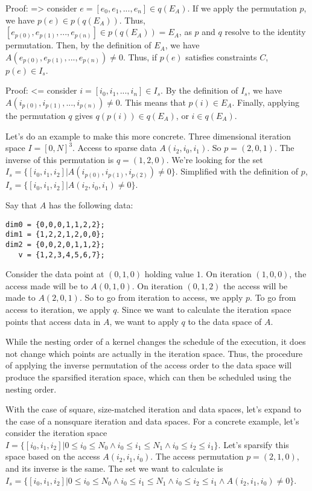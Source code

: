 Proof: => 
consider $e = [e_0,e_1,...,e_n] \in q(E_A)$.
If we apply the permutation $p$, we have $p(e) \in p(q(E_A))$.
Thus, $[e_{p(0)},e_{p(1)},...,e_{p(n)}] \in p(q(E_A)) = E_A$, as $p$ and $q$ resolve to the identity permutation.
Then, by the definition of $E_A$, we have $A(e_{p(0)},e_{p(1)},...,e_{p(n)}) \neq 0$. 
Thus, if $p(e)$ satisfies constraints $C$, $p(e) \in I_s$. 

Proof: <=
consider $i = [i_0,i_1,...,i_n] \in I_s$. 
By the definition of $I_s$, we have $A(i_{p(0)},i_{p(1)},...,i_{p(n)}) \neq 0$.
This means that $p(i) \in E_A$.
Finally, applying the permutation $q$ gives $q(p(i)) \in q(E_A)$, or $i \in q(E_A)$.

Let's do an example to make this more concrete.
Three dimensional iteration space $I = [0,N]^3$.
Access to sparse data $A(i_2,i_0,i_1)$. 
So $p=(2,0,1)$.
The inverse of this permutation is $q=(1,2,0)$.
We're looking for the set $I_s = \{[i_0,i_1,i_2] | A(i_{p(0)},i_{p(1)},i_{p(2)}) \neq 0\}$. 
Simplified with the definition of $p$, $I_s = \{ [i_0,i_1,i_2] | A(i_2,i_0,i_1) \neq 0\}$.

Say that $A$ has the following data:
\begin{lstlisting}
dim0 = {0,0,0,1,1,2,2};
dim1 = {1,2,2,1,2,0,0};
dim2 = {0,0,2,0,1,1,2};
   v = {1,2,3,4,5,6,7};
\end{lstlisting}
Consider the data point at $(0,1,0)$ holding value $1$. 
On iteration $(1,0,0)$, the access made will be to $A(0,1,0)$.
On iteration $(0,1,2)$ the access will be made to $A(2,0,1)$.
So to go from iteration to access, we apply $p$. 
To go from access to iteration, we apply $q$.
Since we want to calculate the iteration space points that access data in $A$, we want to apply $q$ to the data space of $A$.

While the nesting order of a kernel changes the schedule of the execution, it does not change which points are actually in the iteration space.
Thus, the procedure of applying the inverse permutation of the access order to the data space will produce the sparsified iteration space, which can then be scheduled using the nesting order.

With the case of square, size-matched iteration and data spaces, let's expand to the case of a nonsquare iteration and data spaces.
For a concrete example, let's consider the iteration space $I = \{[i_0,i_1,i_2] | 0 \leq i_0 \leq N_0 \land i_0 \leq i_1 \leq N_1 \land i_0 \leq i_2 \leq i_1 \}$.
Let's sparsify this space based on the access $A(i_2,i_1,i_0)$. 
The access permutation $p=(2,1,0)$, and its inverse is the same.
The set we want to calculate is $I_s = \{[i_0,i_1,i_2] | 0 \leq i_0 \leq N_0 \land i_0 \leq i_1 \leq N_1 \land i_0 \leq i_2 \leq i_1 \land A(i_2,i_1,i_0) \neq 0 \}$.

